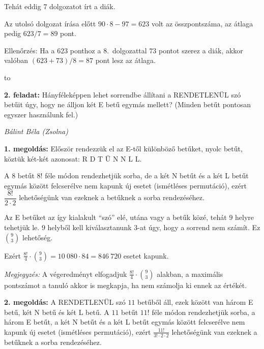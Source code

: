 \documentclass[a4paper,10pt]{article}
\newcommand{\ki}[2]{\hfill {\it #1 (#2)}\medskip}
\newcommand{\vonal}{\hbox to \hsize{\hskip2truecm\hrulefill\hskip2truecm}}
\begin{document}
\smallskip

\noindent Tehát eddig $7$ dolgozatot írt a diák. 

\smallskip

\noindent Az utolsó dolgozat írása előtt $90 \cdot 8-97=623$ volt az összpontszáma, az átlaga pedig $623/7=89$ pont.

\smallskip
\noindent Ellenőrzés: Ha a $623$ ponthoz a $8$.~dolgozattal $73$ pontot szerez a diák, akkor valóban  $(623+73)/8=87$ pont lesz az átlaga.

\vonal

{\bf 2. feladat: } Hányféleképpen lehet sorrendbe állítani a RENDETLENÜL szó betűit úgy, hogy ne álljon két E betű egymás mellett?  (Minden betűt pontosan egyszer használunk fel.)

\ki{Bálint Béla}{Zsolna}\medskip

{\bf 1. megoldás: } Először rendezzük el az E-től különböző betűket,  nyolc betűt, köztük két-két azonosat: R D T Ü N N L L. 

\smallskip

\noindent A $8$ betűt $8!$ féle módon rendezhetjük sorba, de a két N betűt és a két L betűt egymás között felcserélve nem kapunk új esetet (ismétléses permutáció), ezért $\dfrac {8!}{2\cdot 2}$ lehetőségünk van ezeknek a betűknek a sorba rendezéséhez. 

\smallskip

\noindent Az E betűket az így kialakult ``szó'' elé, utána vagy a betűk közé, tehát $9$ helyre tehetjük le. $9$ helyből kell kiválasztanunk $3$-at úgy, hogy a sorrend nem számít. Ez $\displaystyle\binom 9 3$ lehetőség. 

\smallskip

\noindent Ezért $\displaystyle\frac {8!}{4} \cdot \binom 9 3 =10\ 080 \cdot 84=846\ 720$ esetet kapunk.

\emph{Megjegyzés:} A végeredményt elfogadjuk $\displaystyle\frac {8!}{4} \cdot \binom 9 3$ alakban, a maximális pontszámot a tanuló akkor is megkapja, ha nem számolja ki ennek az értékét.

\medskip

{\bf 2. megoldás: } A RENDETLENÜL szó $11$ betűből áll, ezek között van három E betű, két N betű és két L betű. 
A $11$ betűt $11!$ féle módon rendezhetjük sorba, a három E betűt, a két N betűt és a két L betűt egymás között felcserélve nem kapunk új esetet (ismétléses permutáció), ezért $\displaystyle\frac {11!}{3! \cdot  2\cdot 2}$ lehetőségünk van ezeknek a betűknek a sorba rendezéséhez.
\end{document}

